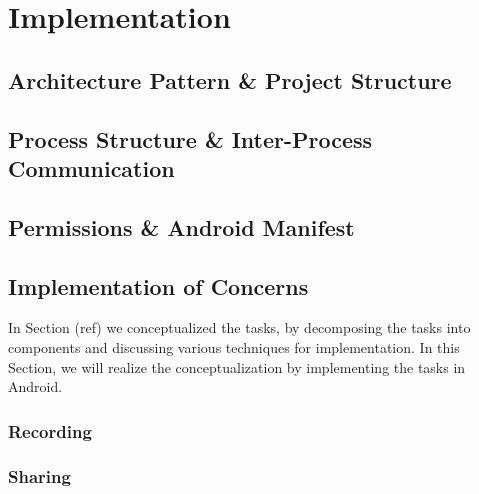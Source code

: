 \chapter{Implementation}

\section{Architecture Pattern \& Project Structure}
\section{Process Structure \& Inter-Process Communication}
\section{Permissions \& Android Manifest}

\section{Implementation of Concerns}
In Section (ref) we conceptualized the tasks, by decomposing the tasks into components and discussing various techniques for implementation. In this Section, we will realize the conceptualization by implementing the tasks in Android. 

\subsection{Recording}





\subsection{Sharing}

